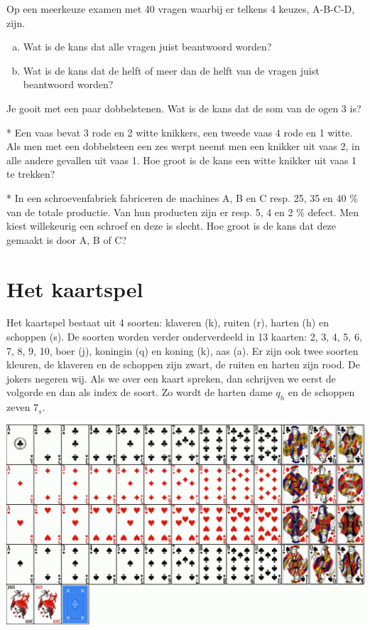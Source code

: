 \documentclass[12pt,a4paper,twoside]{article}
\begin{document}
\begin{oefening}
Op een meerkeuze examen met 40 vragen waarbij er telkens 4 keuzes, A-B-C-D, zijn.
\begin{enumerate}[(a)]
  \item Wat is de kans dat alle vragen juist beantwoord worden?
  \item Wat is de kans dat de helft of meer dan de helft van de vragen juist beantwoord worden?
\end{enumerate}
\end{oefening}

\begin{oefening}
Je gooit met een paar dobbelstenen. Wat is de kans dat de som van de ogen 3 is?
\end{oefening}

\begin{oefening}*
Een vaas bevat 3 rode en 2 witte knikkers, een tweede vaas 4 rode en 1 witte. Als men met een dobbelsteen een zes werpt neemt men een knikker uit vaas 2, in alle andere gevallen uit vaas 1. Hoe groot is de kans een witte knikker uit vaas 1 te trekken?
\end{oefening}

\begin{oefening}*
In een schroevenfabriek fabriceren de machines A, B en C resp. 25, 35 en 40 \% van de totale productie. Van hun producten zijn er resp. 5, 4 en 2 \% defect. Men kiest willekeurig een schroef en deze is slecht. Hoe groot is de kans dat deze gemaakt
is door A, B of C?
\end{oefening}

\appendix
\cleardoublepage
\section{Het kaartspel}
Het kaartspel bestaat uit 4 soorten: klaveren (k), ruiten (r), harten (h) en schoppen (s). De soorten worden verder onderverdeeld in 13 kaarten: 2, 3, 4, 5, 6, 7, 8, 9, 10, boer (j), koningin (q) en koning (k), aas (a). Er zijn ook twee soorten kleuren, de klaveren en de schoppen zijn zwart, de ruiten en harten zijn rood. De jokers negeren wij. Als we over een kaart spreken, dan schrijven we eerst de volgorde en dan als index de soort. Zo wordt de harten dame $q_h$ en de schoppen zeven $7_s$.

\includegraphics[width=\textwidth, angle=0]{kaartspel}
\end{document}
